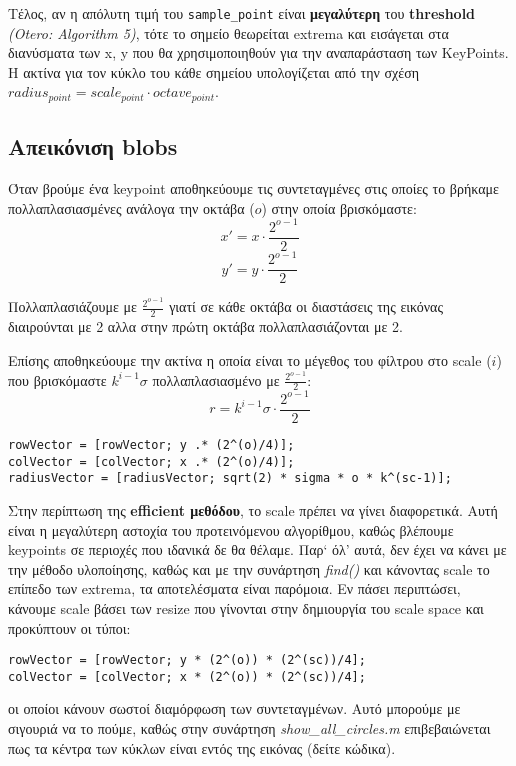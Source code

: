 \documentclass[11pt]{scrartcl} %
\begin{document}
Τέλος, αν η απόλυτη τιμή του \texttt{sample\_point} είναι \textbf{μεγαλύτερη} του \textbf{threshold} \textit{(Otero: Algorithm 5)}\cite{otero},
τότε το σημείο θεωρείται extrema και εισάγεται στα διανύσματα των x, y που θα χρησιμοποιηθούν για την αναπαράσταση των KeyPoints.
Η ακτίνα για τον κύκλο του κάθε σημείου υπολογίζεται από την σχέση $radius_{point} = scale_{point}\cdot octave_{point}$.
\subsection{Απεικόνιση blobs}

Όταν βρούμε ένα keypoint αποθηκεύουμε τις συντεταγμένες στις οποίες το βρήκαμε πολλαπλασιασμένες ανάλογα την οκτάβα ($ο$) στην οποία βρισκόμαστε:
\[x' = x \cdot \frac{2^{o-1}}{2}\]
\[y' = y \cdot \frac{2^{o-1}}{2}\]

Πολλαπλασιάζουμε με $\frac{2^{o-1}}{2}$ γιατί σε κάθε οκτάβα οι διαστάσεις της εικόνας διαιρούνται με 2 αλλα στην πρώτη οκτάβα πολλαπλασιάζονται με 2.

Επίσης αποθηκεύουμε την ακτίνα η οποία είναι το μέγεθος του φίλτρου στο scale ($i$) που βρισκόμαστε $k^{i-1} \sigma$
πολλαπλασιασμένο με $\frac{2^{o-1}}{2}$:
\[r = k^{i-1} \sigma \cdot \frac{2^{o-1}}{2}\]

\begin{verbatim}
rowVector = [rowVector; y .* (2^(o)/4)];
colVector = [colVector; x .* (2^(o)/4)];
radiusVector = [radiusVector; sqrt(2) * sigma * o * k^(sc-1)];
\end{verbatim}

Στην περίπτωση της \textbf{efficient μεθόδου}, το scale πρέπει να γίνει διαφορετικά.
Αυτή είναι η μεγαλύτερη αστοχία του προτεινόμενου αλγορίθμου, καθώς βλέπουμε keypoints
σε περιοχές που ιδανικά δε θα θέλαμε. Παρ` όλ' αυτά, δεν έχει να κάνει με την μέθοδο υλοποίησης,
καθώς και με την συνάρτηση \textit{find()} και κάνοντας scale το επίπεδο των extrema, τα αποτελέσματα
είναι παρόμοια. Εν πάσει περιπτώσει, κάνουμε scale βάσει των resize που γίνονται στην δημιουργία του
scale space και προκύπτουν οι τύποι:
\begin{verbatim}
rowVector = [rowVector; y * (2^(o)) * (2^(sc))/4];
colVector = [colVector; x * (2^(o)) * (2^(sc))/4];
\end{verbatim}
οι οποίοι κάνουν σωστοί διαμόρφωση των συντεταγμένων. Αυτό μπορούμε με σιγουριά να το πούμε, καθώς
στην συνάρτηση \textit{show\_all\_circles.m} επιβεβαιώνεται πως τα κέντρα των κύκλων είναι εντός της
εικόνας (δείτε κώδικα).
\end{document}
